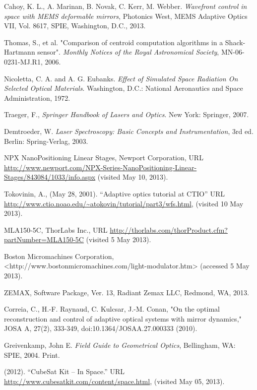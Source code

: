 \documentclass[12pt]{article}
\begin{document}
\begin{thebibliography}{99}
   Cahoy, K. L., A. Marinan, B. Novak, C. Kerr, M. Webber. 
   \emph{Wavefront control in space with MEMS deformable mirrors},
   Photonics West, MEMS Adaptive Optics VII, Vol. 8617, SPIE,
   Washington, D.C., 2013.

Thomas, S., et al. "Comparison of centroid computation algorithms in a Shack-Hartmann sensor". \emph{Monthly Notices of the Royal Astronomical Society}, MN-06-0231-MJ.R1, 2006.

   Nicoletta, C. A. and A. G. Eubanks.
   \emph{Effect of Simulated Space Radiation On Selected Optical
     Materials}. Washington, D.C.: National Aeronautics and Space
   Administration, 1972.

   Traeger, F., \emph{Springer Handbook of Lasers and Optics}. New
   York: Springer, 2007.

   Demtroeder, W.
   \emph{Laser Spectroscopy: Basic Concepts and Instrumentation}, 3rd
   ed. Berlin: Spring-Verlag, 2003.

   NPX NanoPositioning Linear Stages, Newport Corporation,
   URL \url{http://www.newport.com/NPX-Series-NanoPositioning-Linear-Stages/843084/1033/info.aspx}
   (visited May 10, 2013).

   Tokovinin, A., (May 28, 2001). ``Adaptive optics tutorial at CTIO'' URL
   \url{http://www.ctio.noao.edu/~atokovin/tutorial/part3/wfs.html}, 
   (visited 10 May 2013).

   MLA150-5C, ThorLabs Inc.,
   URL \url{http://thorlabs.com/thorProduct.cfm?partNumber=MLA150-5C}
   (visited 5 May 2013).

Boston Micromachines Corporation, <http://www.bostonmicromachines.com/light-modulator.htm> (accessed 5 May 2013).

   ZEMAX, Software Package, Ver. 13, Radiant Zemax LLC, Redmond, WA, 2013.

  Correia, C., H.-F. Raynaud, C. Kulcsar, J.-M. Conan, "On the optimal reconstruction and control of adaptive optical systems with mirror dynamics," JOSA A, 27(2), 333-349, doi:10.1364/JOSAA.27.000333 (2010).

   Greivenkamp, John E. 
   \emph{Field Guide to Geometrical Optics}, Bellingham, WA: SPIE, 2004. Print.



 (2012).  ``CubeSat Kit -- In Space.''  URL \url{http://www.cubesatkit.com/content/space.html}, (visited May 05, 2013).


\end{thebibliography}
\end{document}

